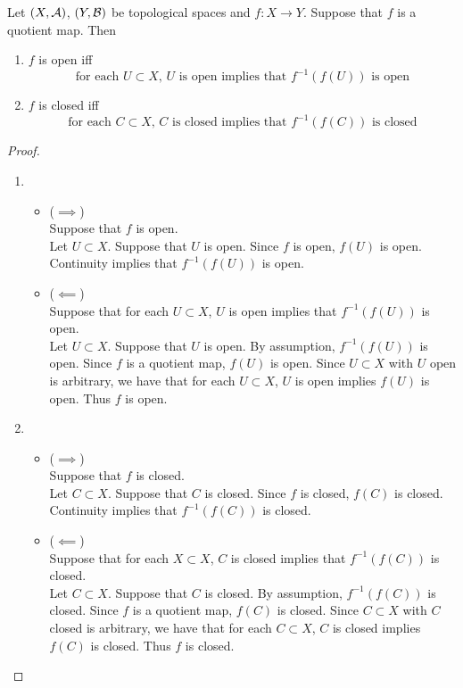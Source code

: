 \documentclass{book}
\begin{document}
	\begin{ex} 
	Let $(X, \mathcal{A})$, $(Y, \mathcal{B})$ be topological spaces and $f:X \rightarrow Y$. Suppose that $f$ is a quotient map. Then 
	\begin{enumerate}
		\item $f$ is open iff 
		$$\text{for each $U \subset X$, $U$ is open implies that $f^{-1}(f(U))$ is open} $$
		\item $f$ is closed iff 
		$$\text{for each $C \subset X$, $C$ is closed implies that $f^{-1}(f(C))$ is closed} $$
	\end{enumerate}
	\end{ex}
	
	\begin{proof}\
	\begin{enumerate}
		\item 
		\begin{itemize}	
			\item ($\implies$) \\
			Suppose that $f$ is open.\\
			Let $U \subset X$. Suppose that $U$ is open. Since $f$ is open, $f(U)$ is open. Continuity implies that $f^{-1}(f(U))$ is open.\\ 
			\item ($\impliedby$) \\
			Suppose that for each $U \subset X$, $U$ is open implies that $f^{-1}(f(U))$ is open. \\
			Let $U \subset X$. Suppose that $U$ is open. By assumption, $f^{-1}(f(U))$ is open. Since $f$ is a quotient map, $f(U)$ is open. Since $U \subset X$ with $U$ open is arbitrary, we have that for each $U \subset X$, $U$ is open implies $f(U)$ is open. Thus $f$ is open.
		\end{itemize}
		\item 
		\begin{itemize}	
			\item ($\implies$) \\
			Suppose that $f$ is closed.\\
			Let $C \subset X$. Suppose that $C$ is closed. Since $f$ is closed, $f(C)$ is closed. Continuity implies that $f^{-1}(f(C))$ is closed.\\ 
			\item ($\impliedby$) \\
			Suppose that for each $X \subset X$, $C$ is closed implies that $f^{-1}(f(C))$ is closed. \\
			Let $C \subset X$. Suppose that $C$ is closed. By assumption, $f^{-1}(f(C))$ is closed. Since $f$ is a quotient map, $f(C)$ is closed. Since $C \subset X$ with $C$ closed is arbitrary, we have that for each $C \subset X$, $C$ is closed implies $f(C)$ is closed. Thus $f$ is closed.
		\end{itemize}
	\end{enumerate}
	\end{proof}
	
\end{document}
